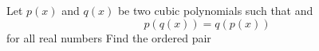 Let $p(x)$ and $q(x)$ be two cubic polynomials such that   and \[p(q(x))=q(p(x))\] for all real numbers   Find the ordered pair 